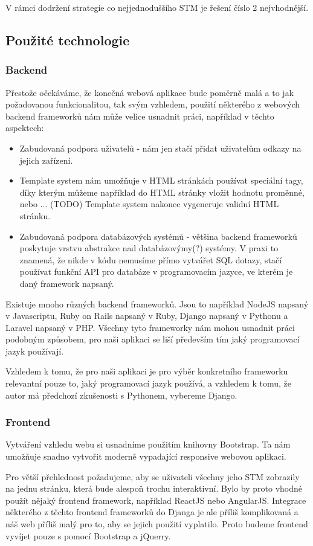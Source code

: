 V rámci dodržení strategie co nejjednoduššího STM je řešení číslo 2 nejvhodnější.

\subsection{Použité technologie}

\subsubsection{Backend}
Přestože očekáváme, že konečná webová aplikace bude poměrně malá a to jak požadovanou funkcionalitou, tak svým
vzhledem, použití některého z webových backend frameworků nám může velice usnadnit práci, například v těchto
aspektech:
\begin{itemize}
    \item Zabudovaná podpora uživatelů - nám jen stačí přidat uživatelům odkazy na jejich
        zařízení.
    \item Template system nám umožňuje v HTML stránkách používat speciální
        tagy, díky kterým můžeme například do HTML stránky vložit hodnotu proměnné, nebo ... (TODO)
        Template system nakonec vygeneruje validní HTML stránku.
    \item Zabudovaná podpora databázových systémů - většina backend frameworků poskytuje vrstvu abstrakce nad
        databázovýmy(?) systémy. V praxi to znamená, že nikde v kódu nemusíme přímo vytvářet SQL dotazy,
        stačí používat funkční API pro databáze v programovacím jazyce, ve kterém je daný framework napsaný.
\end{itemize}

Existuje mnoho různých backend frameworků.
Jsou to například NodeJS napsaný v Javascriptu, Ruby on Rails napsaný v Ruby, Django napsaný v Pythonu a
Laravel napsaný v PHP. %
Všechny tyto frameworky nám mohou usnadnit práci podobným způsobem, pro naši aplikaci se liší především
tím jaký programovací jazyk používají.

Vzhledem k tomu, že pro naši aplikaci je pro výběr konkretního frameworku relevantní pouze to, jaký programovací
jazyk používá, a vzhledem k tomu, že autor má předchozí zkušenosti s Pythonem, vybereme Django.

\subsubsection{Frontend}
Vytváření vzhledu webu si usnadníme použitím knihovny Bootstrap.
Ta nám umožňuje snadno vytvořit moderně vypadající responsive webovou aplikaci. %

Pro větší přehlednost požadujeme, aby se uživateli všechny jeho STM zobrazily na jednu stránku,
která bude alespoň trochu interaktivní.
Bylo by proto vhodné použít nějaký frontend framework, například ReactJS nebo AngularJS.
Integrace některého z těchto frontend frameworků do Djanga je ale příliš komplikovaná a náš web
příliš malý pro to, aby se jejich použití vyplatilo.
Proto budeme frontend vyvíjet pouze s pomocí Bootstrap a jQuerry.
